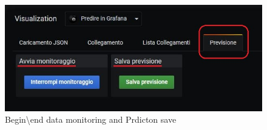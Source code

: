 \begin{figure}[H]
\centering
\includegraphics[scale=0.50]{img/plug-in/save_previsione.jpg}
\caption{Begin\textbackslash end data monitoring and Prdicton save}
\end{figure} 
 

